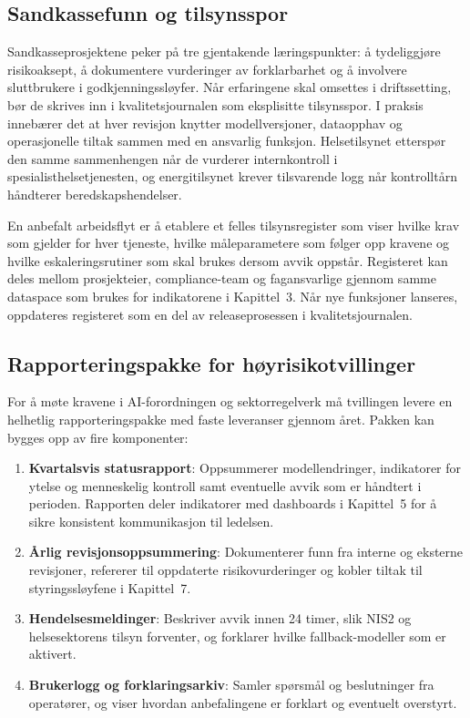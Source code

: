\subsection{Sandkassefunn og tilsynsspor}
Sandkasseprosjektene peker på tre gjentakende læringspunkter: å tydeliggjøre risikoaksept, å dokumentere vurderinger av forklarbarhet og å involvere sluttbrukere i godkjenningssløyfer.\citep{datatilsynet2023sandkasse} Når erfaringene skal omsettes i driftssetting, bør de skrives inn i kvalitetsjournalen som eksplisitte tilsynsspor. I praksis innebærer det at hver revisjon knytter modellversjoner, dataopphav og operasjonelle tiltak sammen med en ansvarlig funksjon. Helsetilsynet etterspør den samme sammenhengen når de vurderer internkontroll i spesialisthelsetjenesten, og energitilsynet krever tilsvarende logg når kontrolltårn håndterer beredskapshendelser.\citep{energinorge2023beredskap,helsetilsynet2024internkontroll}

En anbefalt arbeidsflyt er å etablere et felles tilsynsregister som viser hvilke krav som gjelder for hver tjeneste, hvilke måleparametere som følger opp kravene og hvilke eskaleringsrutiner som skal brukes dersom avvik oppstår. Registeret kan deles mellom prosjekteier, compliance-team og fagansvarlige gjennom samme dataspace som brukes for indikatorene i Kapittel~3. Når nye funksjoner lanseres, oppdateres registeret som en del av releaseprosessen i kvalitetsjournalen.

\subsection{Rapporteringspakke for høyrisikotvillinger}
For å møte kravene i AI-forordningen og sektorregelverk må tvillingen levere en helhetlig rapporteringspakke med faste leveranser gjennom året. Pakken kan bygges opp av fire komponenter:
\begin{enumerate}
    \item \textbf{Kvartalsvis statusrapport}: Oppsummerer modellendringer, indikatorer for ytelse og menneskelig kontroll samt eventuelle avvik som er håndtert i perioden. Rapporten deler indikatorer med dashboards i Kapittel~5 for å sikre konsistent kommunikasjon til ledelsen.
    \item \textbf{Årlig revisjonsoppsummering}: Dokumenterer funn fra interne og eksterne revisjoner, refererer til oppdaterte risikovurderinger og kobler tiltak til styringssløyfene i Kapittel~7.
    \item \textbf{Hendelsesmeldinger}: Beskriver avvik innen 24 timer, slik NIS2 og helsesektorens tilsyn forventer, og forklarer hvilke fallback-modeller som er aktivert.\citep{eu2022nis2,ehelse2024tilsyn}
    \item \textbf{Brukerlogg og forklaringsarkiv}: Samler spørsmål og beslutninger fra operatører, og viser hvordan anbefalingene er forklart og eventuelt overstyrt.
\end{enumerate}

